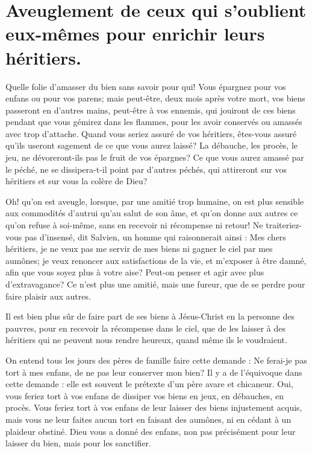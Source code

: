 \documentclass[instructions.tex]{subfiles}
\begin{document}
 
\chapter{Aveuglement de ceux qui s'oublient eux-mêmes pour enrichir leurs héritiers.}
 
\primo Quelle folie d'amasser du bien sans savoir pour qui! Vous épargnez pour vos enfans ou pour vos parens; mais peut-être, deux mois après votre mort, vos biens passeront en d'autres mains, peut-être à vos ennemis, qui jouiront de ces biens pendant que vous gémirez dans les flammes, pour les avoir conservés ou amassés avec trop d'attache. Quand vous seriez assuré de vos héritiers, êtes-vous assuré qu'ils useront sagement de ce que vous aurez laissé? La débauche, les procès, le jeu, ne dévoreront-ils pas le fruit de vos épargnes? Ce que vous aurez amassé par le péché, ne se dissipera-t-il point par d'autres péchés, qui attireront sur vos héritiers et sur vous la colère de Dieu?
 
Oh! qu'on est aveugle, lorsque, par une amitié trop humaine, on est plus sensible aux commodités d'autrui qu'au salut de son âme, et qu'on donne aux autres ce qu'on refuse à soi-même, sans en recevoir ni récompense ni retour! Ne traiteriez-vous pas d'insensé, dit Salvien, un homme qui raisonnerait ainsi : Mes chers héritiers, je ne veux pas me servir de mes biens ni gagner le ciel par mes aumônes; je veux renoncer aux satisfactions de la vie, et m'exposer à être damné, afin que vous soyez plus à votre aise? Peut-on penser et agir avec plus d'extravagance? Ce n'est plus une amitié, mais une fureur, que de se perdre pour faire plaisir aux autres.
 
Il est bien plus sûr de faire part de ses biens à Jésus-Christ en la personne des pauvres, pour en recevoir la récompense dans le ciel, que de les laisser à des héritiers qui ne peuvent nous rendre heureux, quand même ils le voudraient.
 
\secundo On entend tous les jours des pères de famille faire cette demande : Ne ferai-je pas tort à mes enfans, de ne pas leur conserver mon bien? Il y a de l'équivoque dans cette demande : elle est souvent le prétexte d'un père avare et chicaneur. Oui, vous feriez tort à vos enfans de dissiper vos biens en jeux, en débauches, en procès. Vous feriez tort à vos enfans de leur laisser des biens injustement acquis, mais vous ne leur faites aucun tort en faisant des aumônes, ni en cédant à un plaideur obstiné. Dieu vous a donné des enfans, non pas précisément pour leur laisser du bien, mais pour les sanctifier.
 
\end{document}
